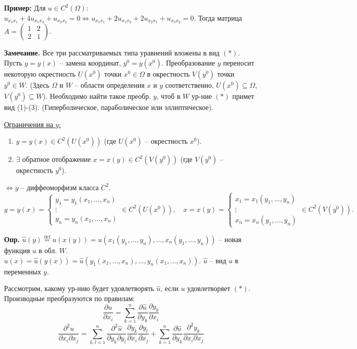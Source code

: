 \documentclass[12pt, a4paper]{article}
\begin{document}
\textbf{Пример:}
Для $u \in C^2(\Omega)$:
$u_{x_1x_1} + 4u_{x_1x_2} + u_{x_2x_2} = 0 \Leftrightarrow u_{x_1x_1} + 2u_{x_1x_2} + 2u_{x_2x_1} + u_{x_2x_2} = 0$.
Тогда матрица $A = \begin{pmatrix} 1 & 2 \\ 2 & 1 \end{pmatrix}$.

\textbf{Замечание.} Все три рассматриваемых типа уравнений вложены в вид $(*)$.
Пусть $y=y(x)$ -- замена координат, $y^0=y(x^0)$.
Преобразование $y$ переносит некоторую окрестность $U(x^0)$ точки $x^0 \in \Omega$ в окрестность $V(y^0)$ точки $y^0 \in W$. (Здесь $\Omega$ и $W$ -- области определения $x$ и $y$ соответственно, $U(x^0) \subseteq \Omega$, $V(y^0) \subseteq W$).
Необходимо найти такое преобр. $y$, чтоб в $W$ ур-ние $(*)$ примет вид (1)-(3). (Гиперболическое, параболическое или эллиптическое).

\underline{Ограничения на $y$:}
\begin{enumerate}
    \item $y = y(x) \in C^2(U(x^0))$ (где $U(x^0)$ -- окрестность $x^0$).
    \item $\exists$ обратное отображение $x = x(y) \in C^2(V(y^0))$ (где $V(y^0)$ -- окрестность $y^0$).
\end{enumerate}
$\iff y$ -- диффеоморфизм класса $C^2$.
\[
y = y(x) = \begin{cases} y_1 = y_1(x_1, \dots, x_n) \\ \vdots \\ y_n = y_n(x_1, \dots, x_n) \end{cases} \in C^2(U(x^0)), \quad
x = x(y) = \begin{cases} x_1 = x_1(y_1, \dots, y_n) \\ \vdots \\ x_n = x_n(y_1, \dots, y_n) \end{cases} \in C^2(V(y^0)).
\]

\textbf{Опр.} $\hat{u}(y) \stackrel{\text{def}}{=} u(x(y)) = u(x_1(y_1, \dots, y_n), \dots, x_n(y_1, \dots, y_n))$ -- новая функция $u$ в обл. $W$.
$u(x) = \hat{u}(y(x)) = \hat{u}(y_1(x_1, \dots, x_n), \dots, y_n(x_1, \dots, x_n))$.
$\hat{u}$ -- вид $u$ в переменных $y$.

Рассмотрим, какому ур-нию будет удовлетворять $\hat{u}$, если $u$ удовлетворяет $(*)$.
Производные преобразуются по правилам:
\[
\frac{\partial u}{\partial x_i} = \sum_{k=1}^n \frac{\partial \hat{u}}{\partial y_k} \frac{\partial y_k}{\partial x_i}
\]
\[
\frac{\partial^2 u}{\partial x_i \partial x_j} = \sum_{k,l=1}^n \frac{\partial^2 \hat{u}}{\partial y_k \partial y_l} \frac{\partial y_k}{\partial x_i} \frac{\partial y_l}{\partial x_j} + \sum_{k=1}^n \frac{\partial \hat{u}}{\partial y_k} \frac{\partial^2 y_k}{\partial x_i \partial x_j}
\]
\end{document}

